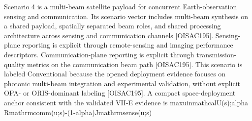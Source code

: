 {}Scenario 4 is a multi-beam satellite payload for concurrent Earth-observation sensing and communication. Its scenario vector includes multi-beam synthesis on a shared payload, spatially separated beam roles, and shared processing architecture across sensing and communication channels [O\markdownRendererUnderscore{}ISAC\markdownRendererUnderscore{}195]. Sensing-plane reporting is explicit through remote-sensing and imaging performance descriptors. Communication-plane reporting is explicit through transmission-quality metrics on the communication beam path [O\markdownRendererUnderscore{}ISAC\markdownRendererUnderscore{}195]. This scenario is labeled Conventional because the opened deployment evidence focuses on photonic multi-beam integration and experimental validation, without explicit OPA- or ORIS-dominant labeling [O\markdownRendererUnderscore{}ISAC\markdownRendererUnderscore{}195].\markdownRendererInterblockSeparator
{}
\markdownRendererSectionEnd \markdownRendererSectionBegin
{}\markdownRendererInterblockSeparator
{}A compact space-deployment anchor consistent with the validated VII-E evidence is\markdownRendererParagraphSeparator
{}\markdownRendererDollarSign{}\markdownRendererDollarSign{}\markdownRendererSoftLineBreak
{}\markdownRendererBackslash{}max\markdownRendererUnderscore{}\markdownRendererLeftBrace{}u\markdownRendererBackslash{}in\markdownRendererBackslash{}mathcal\markdownRendererLeftBrace{}U\markdownRendererRightBrace{}(s)\markdownRendererRightBrace{};\markdownRendererBackslash{}alpha R\markdownRendererUnderscore{}\markdownRendererLeftBrace{}\markdownRendererBackslash{}mathrm\markdownRendererLeftBrace{}comm\markdownRendererRightBrace{}\markdownRendererRightBrace{}(u;s)-(1-\markdownRendererBackslash{}alpha)J\markdownRendererUnderscore{}\markdownRendererLeftBrace{}\markdownRendererBackslash{}mathrm\markdownRendererLeftBrace{}sense\markdownRendererRightBrace{}\markdownRendererRightBrace{}(u;s)\markdownRendererSoftLineBreak
{}\markdownRendererDollarSign{}\markdownRendererDollarSign{}\markdownRendererSoftLineBreak
{}\markdownRendererDollarSign{}\markdownRendererDollarSign{}\markdownRendererSoftLineBreak
